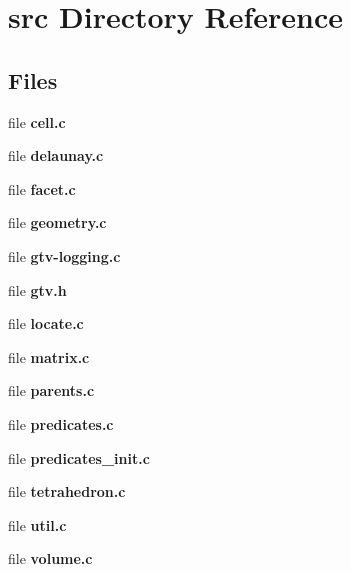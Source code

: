 \section{src Directory Reference}
\label{dir_68267d1309a1af8e8297ef4c3efbcdba}
\subsection*{Files}
\begin{DoxyCompactItemize}
\item 
file {\bfseries cell.\+c}
\item 
file {\bfseries delaunay.\+c}
\item 
file {\bfseries facet.\+c}
\item 
file {\bfseries geometry.\+c}
\item 
file {\bfseries gtv-\/logging.\+c}
\item 
file {\bfseries gtv.\+h}
\item 
file {\bfseries locate.\+c}
\item 
file {\bfseries matrix.\+c}
\item 
file {\bfseries parents.\+c}
\item 
file {\bfseries predicates.\+c}
\item 
file {\bfseries predicates\+\_\+init.\+c}
\item 
file {\bfseries tetrahedron.\+c}
\item 
file {\bfseries util.\+c}
\item 
file {\bfseries volume.\+c}
\end{DoxyCompactItemize}
